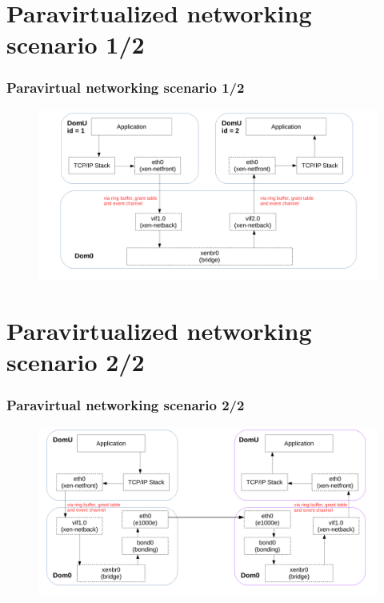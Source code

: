 \documentclass[aspectratio=169]{beamer}
\begin{document}

\section{Paravirtualized networking scenario 1/2}
\begin{frame}
\frametitle{Paravirtual networking scenario 1/2}
\begin{figure}
\includegraphics[width=1.0\linewidth]{figures/xennet2.pdf}
\end{figure}
\end{frame}


\section{Paravirtualized networking scenario 2/2}
\begin{frame}
\frametitle{Paravirtual networking scenario 2/2}
\begin{figure}
\includegraphics[width=1.0\linewidth]{figures/xennet3.pdf}
\end{figure}
\end{frame}
\end{document}
